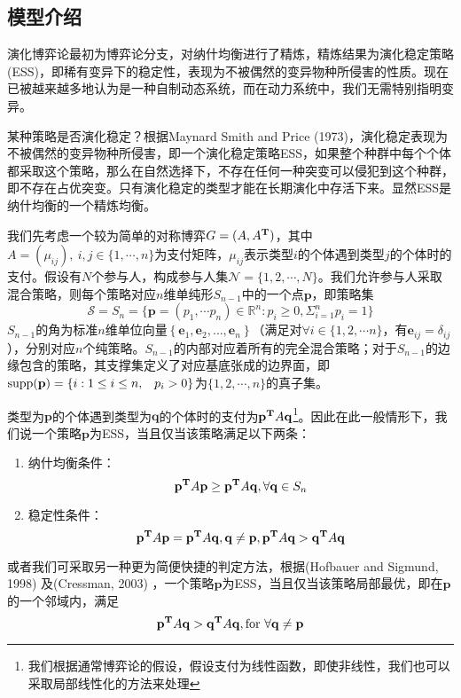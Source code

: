 \documentclass[lang=cn,12pt,a4paper]{elegantpaper}
\begin{document}
\subsection{模型介绍}

演化博弈论最初为博弈论分支，对纳什均衡进行了精炼，精炼结果为演化稳定策略(ESS)，即稀有变异下的稳定性，表现为不被偶然的变异物种所侵害的性质。现在已被越来越多地认为是一种自制动态系统，而在动力系统中，我们无需特别指明变异。

某种策略是否演化稳定？根据Maynard Smith and Price (1973)，演化稳定表现为不被偶然的变异物种所侵害，即一个演化稳定策略ESS，如果整个种群中每个个体都采取这个策略，那么在自然选择下，不存在任何一种突变可以侵犯到这个种群，即不存在占优突变。只有演化稳定的类型才能在长期演化中存活下来。显然ESS是纳什均衡的一个精炼均衡。

我们先考虑一个较为简单的对称博弈$G=(A,A^{\bf{T}})$，其中$A=(\mu_{ij}),\ i,j\in\{1,\cdots,n\}$为支付矩阵，$\mu_{ij}$表示类型$i$的个体遇到类型$j$的个体时的支付。假设有$N$个参与人，构成参与人集$\mathscr{N}=\{1,2,\cdots,N\}$。我们允许参与人采取混合策略，则每个策略对应$n$维单纯形$S_{n-1}$中的一个点$\mathbf{p}$，即策略集
$$
\mathscr{S}=S_n=\{\mathbf{p}=(p_1,\cdots p_n)\in \mathbb{R} ^n :p_i\ge0,\Sigma_{i=1}^n p_i=1\}
$$
$S_{n-1}$的角为标准$n$维单位向量$\left\{\boldsymbol{e}_{1}, \boldsymbol{e}_{2}, \ldots, \boldsymbol{e}_{n}\right\}$（满足对$\forall i\in\{1,2,\cdots n\}$，有$\boldsymbol{e}_{ij}=\delta _{ij}$），分别对应$n$个纯策略。$S_{n-1}$的内部对应着所有的完全混合策略；对于$S_{n-1}$的边缘包含的策略，其支撑集定义了对应基底张成的边界面，即$\operatorname{supp}(\mathbf{p})=\left\{i: 1 \leq i \leq n \text  ,\quad p_{i}>0\right\}$为$\{1,2, \cdots ,n\}$的真子集。

类型为$\mathbf{p}$的个体遇到类型为$\mathbf{q}$的个体时的支付为$\mathbf{p}^{\bf{T}}A\mathbf{q}$\footnote{我们根据通常博弈论的假设，假设支付为线性函数，即使非线性，我们也可以采取局部线性化的方法来处理}。因此在此一般情形下，我们说一个策略$\mathbf{p}$为ESS，当且仅当该策略满足以下两条：

\begin{enumerate}
\item 纳什均衡条件：
\begin{equation}
\mathbf{p}^{\bf{T}}A\mathbf{p}\ge \mathbf{p}^{\bf{T}}A\mathbf{q}, \forall\mathbf{q}\in S_n
\end{equation}
\item 稳定性条件：
\begin{equation}
    \mathbf{p}^{\bf{T}}A\mathbf{p}=\mathbf{p}^{\bf{T}}A\mathbf{q},\mathbf{q}\ne \mathbf{p},\\
\mathbf{p}^{\bf{T}}A\mathbf{q} > \mathbf{q}^{\bf{T}}A\mathbf{q}
\end{equation}
\end{enumerate}
或者我们可采取另一种更为简便快捷的判定方法，根据(Hofbauer and Sigmund, 1998) 及(Cressman, 2003) ，一个策略$\mathbf{p}$为ESS，当且仅当该策略局部最优，即在$\mathbf{p}$的一个邻域内，满足
\begin{equation}
\mathbf{p}^{\bf{T}}A\mathbf{q}>\mathbf{q}^{\bf{T}}A\mathbf{q}, \text{for }\forall \mathbf{q}\ne\mathbf{p}
\end{equation}
\end{document}
